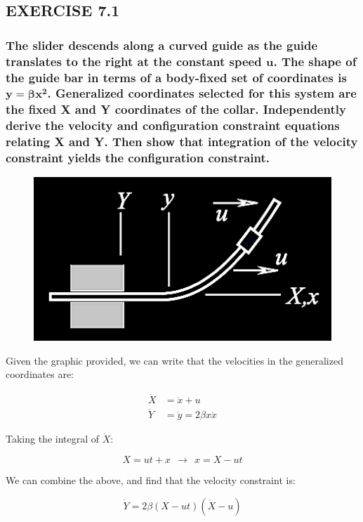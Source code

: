 \documentclass[12pt, letterpaper]{../assignment}
\begin{document}
\subsection*{EXERCISE 7.1}
\subsubsection*{The slider descends along a curved guide as
the guide translates to the right at the constant speed $\bm{u}$.
The shape of the guide bar in terms of a body-fixed set of coordinates is $\bm{y = \beta x^2}$.
Generalized coordinates selected for this system are the fixed X and Y coordinates of the collar.
Independently derive the velocity and configuration constraint equations relating X and Y.
Then show that integration of the velocity constraint yields the configuration constraint.}

\begin{figure}[H]
    \centering
    \includegraphics[scale=0.9,frame]{images/Q7_1.png}
\end{figure}


Given the graphic provided, we can write that the velocities in the generalized coordinates are:

\begin{equation*}
\begin{aligned}
\dot{X} &= \dot{x} + u \\
\dot{Y} &= \dot{y} = 2 \beta x \dot{x}
\end{aligned}
\end{equation*}

Taking the integral of $\dot{X}$:

$$ X = ut + x \ \ \rightarrow \ \ x = X - ut $$

We can combine the above, and find that the velocity constraint is:

$$ \dot{Y}  = 2 \beta \left( X - ut \right) \left( \dot{X} - u \right)  $$
\end{document}
